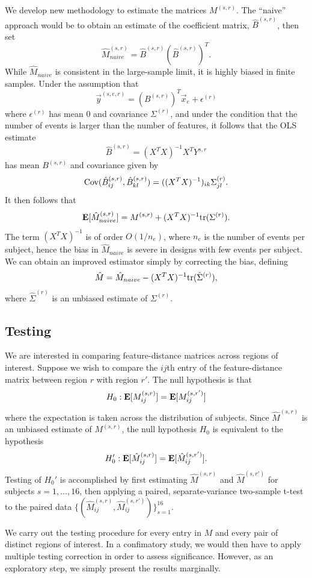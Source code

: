 \documentclass[12pt]{article}
\begin{document}
We develop new methodology to estimate the matrices $M^{(s, r)}$.
The ``naive'' approach would be to obtain an estimate of the coefficient matrix, $\hat{B}^{(s, r)}$, then set
\[
\hat{M}_{naive}^{(s, r)} = \hat{B}^{(s, r)} (\hat{B}^{(s, r)})^T.
\]
While $\hat{M}_{naive}$ is consistent in the large-sample limit, it is highly biased in finite samples.
Under the assumption that
\[
\vec{y}^{(s, e, r)} = (B^{(s, r)})^T \vec{x}_{e} + \epsilon^{(r)}
\]
where $\epsilon^{(r)}$ has mean $0$ and covariance $\Sigma^{(r)}$,
and under the condition that the number of events is larger than the number of features,
it follows that the OLS estimate 
\[
\hat{B}^{(s, r)} = (X^T X)^{-1}X^T Y^{s, r}
\]
has mean $B^{(s, r)}$ and covariance given by
\[
\text{Cov}(\hat{B}^{(s, r)}_{ij}, \hat{B}^{(s, r)}_{kl}) = ((X^TX)^{-1})_{ik} \Sigma^{(r)}_{jl}.
\]
It then follows that
\[
\textbf{E}[\hat{M}_{naive}^{(s, r)}] = M^{(s, r)} + (X^T X)^{-1} \text{tr}(\Sigma^{(r)}).
\]
The term $(X^T X)^{-1}$ is of order $O(1/n_e)$, where $n_e$ is the number of events per subject,
hence the bias in $\hat{M}_{naive}$ is severe in designs with few events per subject.
We can obtain an improved estimator simply by correcting the bias, defining
\[
\hat{M} = \hat{M}_{naive} - (X^T X)^{-1} \text{tr}(\hat{\Sigma}^{(r)}),
\]
where $\hat{\Sigma}^{(r)}$ is an unbiased estimate of $\Sigma^{(r)}$.

\subsection{Testing}

We are interested in comparing feature-distance matrices across regions of interest.
Suppose we wish to compare the $ij$th entry of the feature-distance matrix between region $r$ with region $r'$.  The null hypothesis is that
\[
H_0: \textbf{E}[M^{(s, r)}_{ij}] = \textbf{E}[M^{(s, r')}_{ij}]
\]
where the expectation is taken across the distribution of subjects.
Since $\hat{M}^{(s, r)}$ is an unbiased estimate of $M^{(s, r)}$, the null hypothesis $H_0$ is equivalent to the hypothesis
\[
H_0': \textbf{E}[\hat{M}^{(s, r)}_{ij}] = \textbf{E}[\hat{M}^{(s, r')}_{ij}].
\]
Testing of $H_0'$ is accomplished by first estimating $\hat{M}^{(s, r)}$ and $\hat{M}^{(s, r')}$ for subjects $s = 1,\hdots, 16$,
then applying a paired, separate-variance
two-sample t-test to the paired data $\{(\hat{M}^{(s, r)}_{ij}, \hat{M}^{(s, r')}_{ij})\}_{s=1}^{16}$.

We carry out the testing procedure for every entry in $M$ and every pair of distinct regions of interest.
In a confimatory study, we would then have to apply multiple testing correction in order to assess significance.
However, as an exploratory step, we simply present the results marginally.
\end{document}
